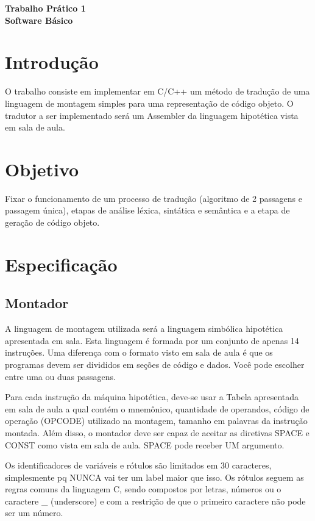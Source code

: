\documentclass[11pt, a4paper]{article}
\begin{document}
\begin{center}
    {\LARGE \textbf{Trabalho Prático 1}}\\[0.3em]
    {\large \textbf{Software Básico}}\\[1.5em]
\end{center}

\section{Introdução}
O trabalho consiste em implementar em C/C++ um método de tradução de uma linguagem de montagem simples para uma representação de código objeto. O tradutor a ser implementado será um Assembler da linguagem hipotética vista em sala de aula.

\section{Objetivo}
Fixar o funcionamento de um processo de tradução (algoritmo de 2 passagens e passagem única), etapas de análise léxica, sintática e semântica e a etapa de geração de código objeto.

\section{Especificação}

\subsection{Montador}
A linguagem de montagem utilizada será a linguagem simbólica hipotética apresentada em sala. Esta linguagem é formada por um conjunto de apenas 14 instruções. Uma diferença com o formato visto em sala de aula é que os programas devem ser divididos em seções de código e dados. Você pode escolher entre uma ou duas passagens.

Para cada instrução da máquina hipotética, deve-se usar a Tabela apresentada em sala de aula a qual contém o mnemônico, quantidade de operandos, código de operação (OPCODE) utilizado na montagem, tamanho em palavras da instrução montada. Além disso, o montador deve ser capaz de aceitar as diretivas SPACE e CONST como vista em sala de aula. SPACE pode receber UM argumento.

Os identificadores de variáveis e rótulos são limitados em 30 caracteres, simplesmente pq NUNCA vai ter um label maior que isso. Os rótulos seguem as regras comuns da linguagem C, sendo compostos por letras, números ou o caractere \_ (underscore) e com a restrição de que o primeiro caractere não pode ser um número.
\end{document}
